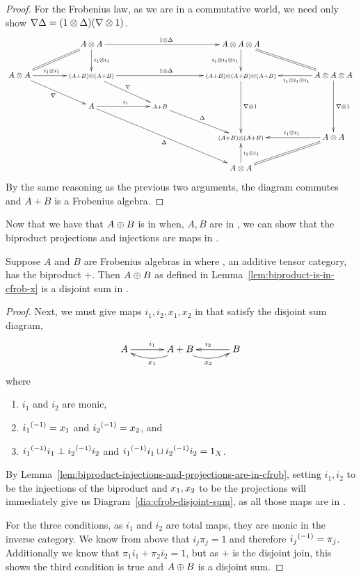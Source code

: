 \begin{proof}
  For the Frobenius law, as we are in a commutative world, we need only show
  $\nabla \Delta = (1\otimes\Delta)(\nabla\otimes1)$.
  \[
  \xymatrix@C+17pt{
      &A\*A \ar@{=}[ld] \ar[rr]^{1\*\Delta} \ar[d]^{i_1\*i_1} && A\*A\*A  \ar[d]_{i_1\*i_1\*i_1} \ar@{=}[dr] \\
      A\*A \ar[r]^(.45){i_1\*i_1}  \ar[dr]_{\nabla}
         &\scriptstyle{(A+B)\*(A+B)} \ar[rr]^{1\*\Delta} \ar[dr]^{\nabla}
         &&\scriptstyle{(A+B)\*(A+B)\*(A+B)}  \ar[dd]^{\nabla\*1} & A\*A\*A  \ar[l]^(.4){i_1\*i_1\*i_1}  \ar[dd]^{\nabla\*1}\\
     & A \ar[r]^{i_1} \ar[ddrr]_{\Delta} & \scriptstyle{A+B} \ar[dr]^{\Delta} \\
     & & & \scriptstyle{(A+B)\*(A+B)} & A\*A  \ar[l]_(.45){i_1\*i_1} \ar@{=}[dl]\\
     & & & A\*A \ar[u]_{i_1\*i_1}
    }
  \]
  By the same reasoning as the previous two arguments, the diagram commutes and $A+B$ is a Frobenius
  algebra.
\end{proof}

Now that we have that $A\oplus B$ is in \CFrob when, $A,B$ are in \CFrob, we can show that the
biproduct projections and injections are maps in \CFrob.


\begin{proposition}\label{prop:cfrobx_has_disjoint_sums}
  Suppose $A$ and $B$ are Frobenius algebras in \CFrob where \X, an additive tensor category, has
  the biproduct $+$.
  Then $A\oplus B$ as defined in Lemma~\ref{lem:biproduct-is-in-cfrob-x} is a disjoint sum in \CFrob.
\end{proposition}
\begin{proof}
  Next, we must give maps $i_1,i_2,x_1,x_2$  in \CFrob that satisfy the disjoint sum diagram,
  \begin{equation}
    \xymatrix@C+10pt{
      A\ar[r]^{i_1} &A+B\ar@/^9pt/[l]^{x_1} \ar@/_9pt/[r]_{x_2} & B \ar[l]_{i_2}
    }\label{dia:cfrob-disjoint-sum}
  \end{equation}
  where
  \begin{enumerate}[{(}i{)}]
    \item $i_1$ and $i_2$ are monic,
    \item ${i_1}^{(-1)} = x_1$ and ${i_2}^{(-1)} = x_2$, and
    \item ${i_1}^{(-1)}i_1 \perp {i_2}^{(-1)}i_2$ and ${i_1}^{(-1)}i_1 \sqcup {i_2}^{(-1)}i_2 = 1_X$.
  \end{enumerate}

  By Lemma~\ref{lem:biproduct-injections-and-projections-are-in-cfrob}, setting $i_1,i_2$ to be the
  injections of the biproduct and $x_1,x_2$ to be the projections will immediately give us
  Diagram~\ref{dia:cfrob-disjoint-sum}, as all those maps are in \CFrob.

  For the three conditions, as $i_1$ and $i_2$ are total maps, they are monic in the inverse
  category. We know from above that $i_j\pi_j = 1$ and therefore ${i_j}^{(-1)} = \pi_j$. Additionally
  we know that $\pi_1i_1 + \pi_2i_2 = 1$, but as $+$ is the disjoint join, this shows the third
  condition is true and $A\oplus B$ is a disjoint sum.
\end{proof}


